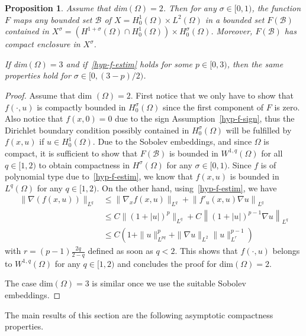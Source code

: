 \documentclass[11pt]{article}
\newtheorem{prop}[theo]{Proposition}
\theoremstyle{definition}
\numberwithin{equation}{section}
\numberwithin{figure}{section}
\numberwithin{table}{section}
\newcommand{\Bc}{\mathcal{B}}
\newcommand{\grad}{\nabla}
\begin{document}
\begin{prop}\label{prop-compact-F}
Assume that dim$(\Omega)=2$. Then for any $\sigma\in [0,1)$, the function $F$ maps any bounded set $\Bc$ of $X=H^1_0(\Omega)\times L^2(\Omega)$ in a bounded set $F(\Bc)$ contained in $X^\sigma= (H^{1+\sigma}(\Omega)\cap H^1_0(\Omega))\times H^\sigma_0(\Omega)$. Moreover, $F(\Bc)$ has compact enclosure in $X^\sigma$.

If dim$(\Omega)=3$ and if~\eqref{hyp-f-estim} holds for some $p\in [0,3)$, then the same properties hold for $\sigma\in [0,(3-p)/2)$.
\end{prop}
\begin{proof}
Assume that dim $(\Omega)=2$. First notice that we only have to show that $f(\cdot,u)$ is compactly bounded in $H^\sigma_0(\Omega)$ since the first component of $F$ is zero. Also notice that $f(x,0)=0$ due to the sign Assumption~\eqref{hyp-f-sign}, thus the Dirichlet boundary condition possibly contained in $H^\sigma_0(\Omega)$ will be fulfilled by $f(x,u)$ if $u\in H^1_0(\Omega)$. Due to the Sobolev embeddings, and since $\Omega$ is compact, it is sufficient to show that $F(\Bc)$ is bounded in $W^{1,q}(\Omega)$ for all $q\in [1,2)$ to obtain compactness in $H^\sigma(\Omega)$ for any $\sigma\in [0,1)$. Since $f$ is of polynomial type due to~\eqref{hyp-f-estim}, we know that $f(x,u)$ is bounded in $L^q(\Omega)$ for any $q\in [1,2)$. On the other hand, using~\eqref{hyp-f-estim}, we have
\begin{align*}
\|\grad(f(x,u))\|_{L^q} & \leq \|\grad_xf(x,u)\|_{L^q} + \left\|f'_u(x,u)\grad u\right\|_{L^q}\\
& \leq C \|(1+|u|)^p \|_{L^q} + C \left\|(1+|u|)^{p-1} \grad u\right\|_{L^q}\\
& \leq C\left(1+\|u\|_{L^{pq}}^p + \|\grad u\|_{L^2} \|u\|^{p-1}_{L^r}\right)
\end{align*}
with $r=(p-1)\frac {2q}{2-q}$ defined as soon as $q<2$. This shows that $f(\cdot,u)$ belongs to $W^{1,q}(\Omega)$ for any $q\in [1,2)$ and concludes the proof for dim$(\Omega)=2$.

The case dim$(\Omega)=3$ is similar once we use the suitable Sobolev embeddings.
\end{proof}


The main results of this section are the following asymptotic compactness properties.
\end{document}
